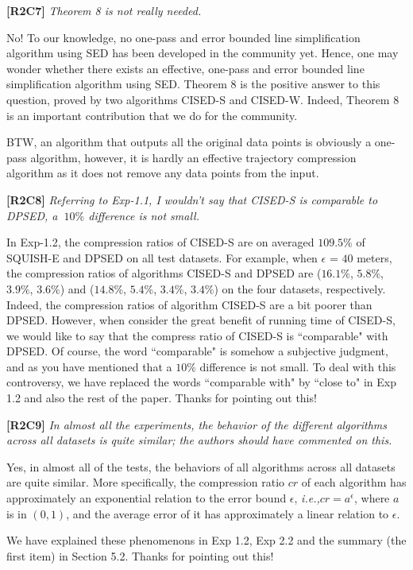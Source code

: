 \documentclass{letter}
\newcommand{\ie}{\emph{i.e.,}\xspace}
\begin{document}
\textbf{[R2C7]} \emph{Theorem 8 is not really needed.}

No! To our knowledge, no one-pass and error bounded line simplification algorithm using SED has been developed in the community yet. Hence, one may wonder whether there exists an effective, one-pass and error bounded line simplification algorithm using SED. Theorem 8 is the positive answer to this question, proved by two algorithms CISED-S and CISED-W. Indeed, Theorem 8 is an important contribution that we do for the community.

BTW, an algorithm that outputs all the original data points is obviously a one-pass algorithm, however, it is hardly an effective trajectory compression algorithm as it does not remove any data points from the input.

\textbf{[R2C8]} \emph{Referring to Exp-1.1, I wouldn't say that CISED-S is comparable to DPSED, a $~10\%$ difference is not small.}

In Exp-1.2, the compression ratios of CISED-S are on averaged $109.5\%$ of SQUISH-E and DPSED on all test datasets. For example, when $\epsilon$ = $40$ meters, the compression ratios of algorithms CISED-S and DPSED are ($16.1\%$, $5.8\%$, $3.9\%$, $3.6\%$) and ($14.8\%$, $5.4\%$, $3.4\%$, $3.4\%$) on the four datasets, respectively. Indeed, the compression ratios of algorithm CISED-S are a bit poorer than DPSED. However, when consider the great benefit of running time of CISED-S, we would like to say that the compress ratio of CISED-S is ``comparable" with DPSED.
%
Of course, the word ``comparable" is somehow a subjective judgment, and as you have mentioned that a $10\%$ difference is not small. To deal with this controversy, we have replaced the words ``comparable with" by ``close to" in Exp 1.2 and also the rest of the paper. Thanks for pointing out this!


\textbf{[R2C9]} \emph{In almost all the experiments, the behavior of the different algorithms across all datasets is quite similar; the authors should have commented on this.}

Yes, in almost all of the tests, the behaviors of all algorithms across all datasets are quite similar. More specifically, the compression ratio $cr$ of each algorithm has approximately an exponential relation to the error bound $\epsilon$, \ie $cr=a^\epsilon$, where $a$ is in $(0,1)$, and the average error of it has approximately a linear relation to $\epsilon$.

We have explained these phenomenons in Exp 1.2, Exp 2.2 and the summary (the first item) in Section 5.2. Thanks for pointing out this!
\end{document}
